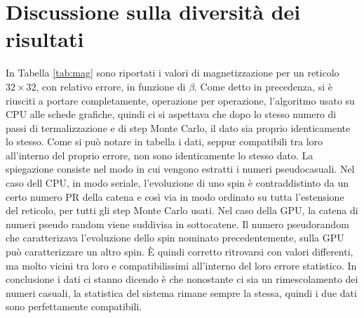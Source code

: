 \documentclass[a4paper,12pt]{article}
\begin{document}
\section{Discussione sulla diversità dei risultati}
In Tabella \ref{tab:mag} sono riportati i valori di magnetizzazione per un reticolo $32\times32$, con relativo errore, in funzione di $\beta$. Come detto in precedenza, si è riusciti a portare completamente, operazione per operazione, l'algoritmo usato su CPU alle schede grafiche, quindi ci si aspettava che dopo lo stesso numero di passi di termalizzazione e di step Monte Carlo, il dato sia proprio identicamente lo stesso. Come si può notare in tabella i dati, seppur compatibili tra loro all'interno del proprio errore, non sono identicamente lo stesso dato. La spiegazione consiste nel modo in cui vengono estratti i numeri pseudocasuali. Nel caso dell CPU, in modo seriale, l'evoluzione di uno spin  è contraddistinto da un certo numero PR della catena e così via in modo ordinato su tutta l'estensione del reticolo, per tutti gli step Monte Carlo usati. Nel caso della GPU, la catena di numeri pseudo random viene suddivisa in sottocatene. Il numero pseudorandom che caratterizava l'evoluzione dello spin nominato precedentemente, sulla GPU può caratterizzare un altro spin. \`E  quindi corretto ritrovarsi con valori differenti, ma molto vicini tra loro e compatibilissimi all'interno del loro errore statistico. In conclusione i dati ci stanno dicendo è che nonostante ci sia un rimescolamento dei numeri casuali, la statistica del sistema rimane sempre la stessa, quindi i due dati sono perfettamente compatibili.   
\end{document}

